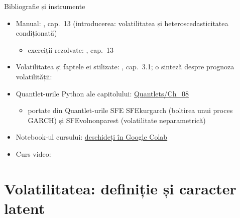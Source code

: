 \begin{frame}{Bibliografie și instrumente}
\itemsize{\small}
\begin{itemize}
    \item Manual: , cap.~13 (introducerea: volatilitatea și heteroscedasticitatea condiționată)
    \begin{itemize}
        \item exerciții rezolvate: , cap.~13
    \end{itemize}
    \item Volatilitatea și faptele ei stilizate: , cap.~3.1; o sinteză despre prognoza volatilității: 
    \item Quantlet-urile Python ale capitolului: \href{https://github.com/danpele/SFM/tree/main/Quantlets/Ch_08}{Quantlets/Ch\_08}
    \begin{itemize}
        \item portate din Quantlet-urile SFE SFEkurgarch (boltirea unui proces GARCH) și SFEvolnonparest (volatilitate neparametrică)
    \end{itemize}
    \item Notebook-ul cursului: \href{\colaburl{notebooks/EN/chapter8_lecture_notebook.ipynb}}{deschideți în Google Colab}
    \item Curs video: 
\end{itemize}
\end{frame}


\section{Volatilitatea: definiție și caracter latent}

